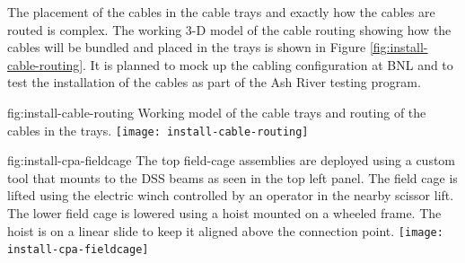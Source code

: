 The placement of the cables in the cable trays and exactly how the cables are routed is complex. The working 3-D model of the cable routing showing how the cables will be bundled and placed in the trays is shown in Figure \ref{fig:install-cable-routing}. It is planned to mock up the cabling configuration at BNL and to test the installation of the cables as part of the Ash River testing program.

\begin{dunefigure}{fig:install-cable-routing}
  {Working model of the cable trays and routing of the cables in the trays.}
\texttt{[image: install-cable-routing]}
\end{dunefigure}


\begin{dunefigure}{fig:install-cpa-fieldcage}
  {The top field-cage assemblies are deployed using a custom tool that mounts to the DSS beams as seen in the top left panel. The field cage is lifted using the electric winch controlled by an operator in the nearby scissor lift. The lower field cage is lowered using a hoist mounted on a wheeled frame. The hoist is on a linear slide to keep it aligned above the connection point.}
\texttt{[image: install-cpa-fieldcage]}
\end{dunefigure}

